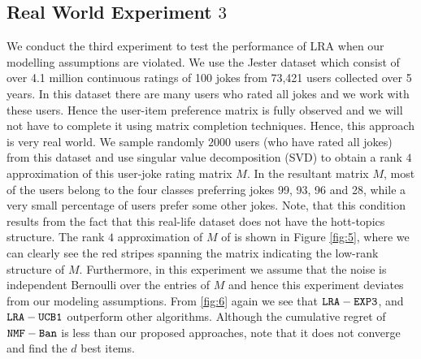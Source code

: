 \subsection{Real World Experiment $3$}
We conduct the third experiment to test the performance of LRA when our modelling assumptions are violated. We use the Jester dataset \citep{goldberg2001eigentaste} which consist of over 4.1 million continuous ratings of 100 jokes from 73,421 users collected over 5 years. In this dataset there are many users who rated all jokes and we work with these users. Hence the user-item preference matrix is fully observed and we will not have to complete it using matrix completion techniques. Hence, this approach is very real world. We sample randomly $2000$ users (who have rated all jokes) from this dataset and use singular value decomposition (SVD) to obtain a rank $4$ approximation of this user-joke rating matrix $M$. In the resultant matrix $M$, most of the users belong to the four classes preferring jokes 99, 93, 96 and 28, while a very small percentage of users prefer some other jokes. Note, that this condition results from the fact that this real-life dataset does not have the hott-topics structure. The rank $4$ approximation of $M$ of  is shown in Figure \ref{fig:5}, where we can clearly see the red stripes spanning the matrix indicating the low-rank structure of $M$. Furthermore, in this experiment we assume that the noise is independent Bernoulli over the entries of $M$ and hence this experiment deviates from our modeling assumptions. From \ref{fig:6} again we see that ${\tt LRA-EXP3}$, and ${\tt LRA-UCB1}$ outperform other algorithms. Although the cumulative regret of ${\tt NMF-Ban}$ is less than our proposed approaches, note that it does not converge and find the $d$ best items.





